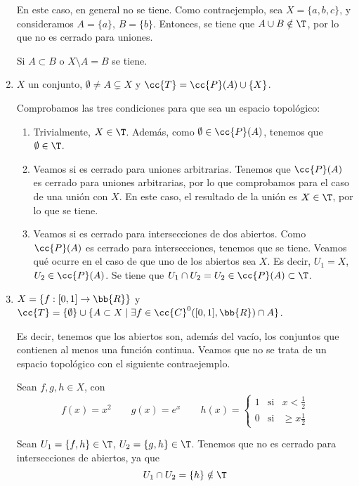 \begin{ejercicio}
\begin{enumerate}[label=\alph*)]
        En este caso, en general no se tiene. Como contraejemplo, sea $X=\{a,b,c\}$, y consideramos $A=\{a\}$, $B=\{b\}$. Entonces, se tiene que $A\cup B\notin \T$, por lo que no es cerrado para uniones.

        Si $A\subset B$ o $X\setminus A=B$ se tiene.

        \item $X$ un conjunto, $\emptyset\neq A \subsetneq X$ y $\cc{T}=\cc{P}(A)\cup \{X\}$.

        Comprobamos las tres condiciones para que sea un espacio topológico:
        \begin{enumerate}
            \item Trivialmente, $X\in \T$. Además, como $\emptyset\in \cc{P}(A)$, tenemos que $\emptyset\in \T$.
            \item Veamos si es cerrado para uniones arbitrarias. Tenemos que $\cc{P}(A)$ es cerrado para uniones arbitrarias, por lo que comprobamos para el caso de una unión con $X$. En este caso, el resultado de la unión es $X\in \T$, por lo que se tiene.

            \item Veamos si es cerrado para intersecciones de dos abiertos. Como $\cc{P}(A)$ es cerrado para intersecciones, tenemos que se tiene. Veamos qué ocurre en el caso de que uno de los abiertos sea $X$. Es decir, $U_1=X$, $U_2\in \cc{P}(A)$. Se tiene que $U_1\cap U_2=U_2\in \cc{P}(A)\subset \T$.
        \end{enumerate}

        \item $X=\{f:[0,1]\to \bb{R}\}$ y $\cc{T}=\{\emptyset\}\cup \{A\subset X\mid \exists f\in \cc{C}^0([0,1],\bb{R})\cap A\}$.

        Es decir, tenemos que los abiertos son, además del vacío, los conjuntos que contienen al menos una función continua. Veamos que no se trata de un espacio topológico con el siguiente contraejemplo.

        Sean $f,g,h\in X$, con
        $$f(x)=x^2 \qquad g(x)=e^x \qquad h(x)=\left\{\begin{array}{ccc}
            1 & \text{si} & x<\frac{1}{2} \\
            0 & \text{si} & \geq x\frac{1}{2}
        \end{array}\right.$$

        Sean $U_1=\{f,h\}\in \T$, $U_2=\{g,h\}\in \T$. Tenemos que no es cerrado para intersecciones de abiertos, ya que
        $$U_1\cap U_2 = \{h\}\notin \T$$
    \end{enumerate}
\end{ejercicio}



